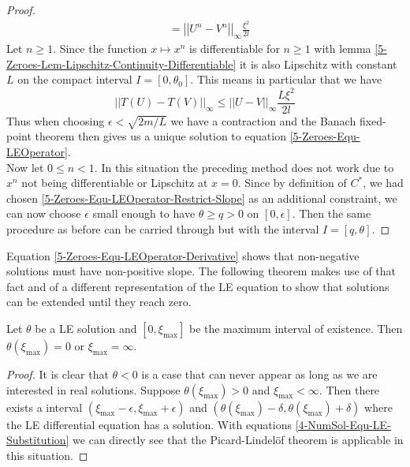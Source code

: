 \begin{proof}
\begin{align}
								&=		\left|\left|U^n-V^n\right|\right|_\infty\frac{\xi^2}{2l}
	\end{align}
	Let $n\geq1$. 
	Since the function $x\mapsto x^n$ is differentiable for $n\geq1$ with lemma \ref{5-Zeroes-Lem-Lipschitz-Continuity-Differentiable} it is also Lipschitz with constant $L$ on the compact interval $I=[0,\theta_0]$.
	This means in particular that we have
	\begin{equation}
		||T(U)-T(V)||_\infty	\leq	\left|\left|U-V\right|\right|_\infty\frac{L\xi^2}{2l}
	\end{equation}
	Thus when choosing $\epsilon<\sqrt{2m/L}$ we have a contraction and the Banach fixed-point theorem then gives us a unique solution to equation \eqref{5-Zeroes-Equ-LEOperator}.\\
	Now let $0\leq n<1$.
	In this situation the preceding method does not work due to $x^n$ not being differentiable or Lipschitz at $x=0$. 
	Since by definition of $C^*$, we had chosen \eqref{5-Zeroes-Equ-LEOperator-Restrict-Slope} as an additional constraint, we can now choose $\epsilon$ small enough to have $\theta\geq q>0$ on $[0,\epsilon]$.
	Then the same procedure as before can be carried through but with the interval $I=[q,\theta]$.
\end{proof}\noindent
Equation \eqref{5-Zeroes-Equ-LEOperator-Derivative} shows that non-negative solutions must have non-positive slope.
The following theorem makes use of that fact and of a different representation of the \ac{LE} equation to show that solutions can be extended until they reach zero.
\begin{lemma}
	Let $\theta$ be a \ac{LE} solution and $[0,\xi_\mathrm{max}]$ be the maximum interval of existence.
	Then $\theta(\xi_\mathrm{max})=0$ or $\xi_\mathrm{max}=\infty$.
\end{lemma}
\begin{proof}
	It is clear that $\theta<0$ is a case that can never appear as long as we are interested in real solutions.
	Suppose $\theta(\xi_\mathrm{max})>0$ and $\xi_\mathrm{max}<\infty$.
	Then there exists a interval $(\xi_\mathrm{max}-\epsilon,\xi_\mathrm{max}+\epsilon)$ and $(\theta(\xi_\mathrm{max})-\delta,\theta(\xi_\mathrm{max})+\delta)$ where the \ac{LE} differential equation has a solution.
	With equations \ref{4-NumSol-Equ-LE-Substitution} we can directly see that the Picard-Lindelöf theorem is applicable in this situation.
\end{proof}
%
%
%
